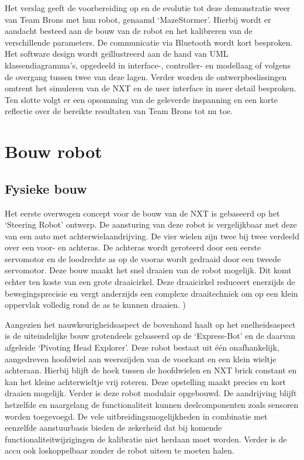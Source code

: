 \documentclass[tt1]{penoverslag}
\begin{document}
Het verslag geeft de voorbereiding op en de evolutie tot deze demonstratie weer van Team Brons met hun robot, genaamd ‘MazeStormer’. Hierbij wordt er aandacht besteed aan de bouw van de robot en het kalibreren van de verschillende parameters. De communicatie via Bluetooth wordt kort besproken. Het software design wordt geïllustreerd aan de hand van UML klassendiagramma’s, opgedeeld in interface-, controller- en modellaag of volgens de overgang tussen twee van deze lagen. Verder worden de ontwerpbeslissingen omtrent het simuleren van de NXT en de user interface in meer detail besproken. Ten slotte volgt er een opsomming van de geleverde inspanning en een korte reflectie over de bereikte resultaten van Team Brons tot nu toe.



\section{Bouw robot}

\subsection{Fysieke bouw}
Het eerste overwogen concept voor de bouw van de NXT is gebaseerd op het ‘Steering Robot’ ontwerp. De aansturing van deze robot is vergelijkbaar met deze van een auto met achterwielaandrijving. De vier wielen zijn twee bij twee verdeeld over een voor- en achteras. De achteras wordt geroteerd door een eerste servomotor en de loodrechte as op de vooras wordt gedraaid door een tweede servomotor. Deze bouw maakt het snel draaien van de robot mogelijk. Dit komt echter ten koste van een grote draaicirkel. Deze draaicirkel reduceert enerzijds de bewegingsprecisie en vergt anderzijds een complexe draaitechniek om op een klein oppervlak volledig rond de as te kunnen draaien. \cite{steeringrobot})

Aangezien het nauwkeurigheidsaspect de bovenhand haalt op het snelheidsaspect is de uiteindelijke bouw grotendeels gebaseerd op de ‘Express-Bot’ en de daarvan afgeleide ‘Pivoting Head Explorer’. Deze robot bestaat uit één onafhankelijk, aangedreven hoofdwiel aan weerszijden van de voorkant en een klein wieltje achteraan. Hierbij blijft de hoek tussen de hoofdwielen en NXT brick constant en kan het kleine achterwieltje vrij roteren. Deze opstelling maakt precies en kort draaien mogelijk. Verder is deze robot modulair opgebouwd. De aandrijving blijft hetzelfde en naargelang de functionaliteit kunnen deelcomponenten zoals sensoren worden toegevoegd. De vele uitbreidingsmogelijkheden in combinatie met eenzelfde aanstuurbasis bieden de zekerheid dat bij komende functionaliteitwijzigingen de kalibratie niet herdaan moet worden. Verder is de accu ook loskoppelbaar zonder de robot uiteen te moeten halen. \cite{expressbot}
\end{document}
